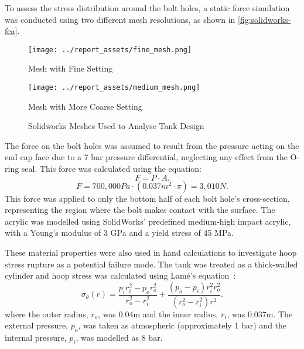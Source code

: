 To assess the stress distribution around the bolt holes, a static force simulation was conducted using two different mesh resolutions, as shown in \autoref{fig:solidworks-fea}. 
\begin{figure}[htbp]
    \centering

    \begin{minipage}{0.45\textwidth}
        \centering
        \texttt{[image: ../report\_assets/fine\_mesh.png]}
        \caption*{Mesh with Fine Setting}
    \end{minipage}
    \hfill
    \begin{minipage}{0.45\textwidth}
        \centering
        \texttt{[image: ../report\_assets/medium\_mesh.png]}
        \caption*{Mesh with More Coarse Setting}
    \end{minipage}
    \caption{Solidworks Meshes Used to Analyse Tank Design}\label{fig:solidworks-fea}
\end{figure}
The force on the bolt holes was assumed to result from the pressure acting on the end cap face due to a 7 bar pressure differential, neglecting any effect from the O-ring seal. This force was calculated using the equation:
\[
F = P \cdot A.
\]
\[
F = 700,000Pa \cdot (0.037m^2 \cdot \pi) = 3,010N.
\]
This force was applied to only the bottom half of each bolt hole's cross-section, representing the region where the bolt makes contact with the surface. The acrylic was modelled using SolidWorks' predefined medium-high impact acrylic, with a Young's modulus of 3 GPa and a yield stress of 45 MPa. 

These material properties were also used in hand calculations to investigate hoop stress rupture as a potential failure mode. The tank was treated as a thick-walled cylinder and hoop stress was calculated using Lamé's equation~\cite{mydatabook_lame}: 
\[
\sigma_\theta(r) = \frac{p_i r_i^2 - p_o r_o^2}{r_o^2 - r_i^2} + \frac{(p_o - p_i) r_i^2 r_o^2}{(r_o^2 - r_i^2) r^2}.
\]
where the outer radius, $r_o$, was 0.04m and the inner radius, $r_i$, was 0.037m. The external pressure, $p_o$, was taken as atmospheric (approximately 1 bar) and the internal pressure, $p_i$, was modelled as 8 bar.
